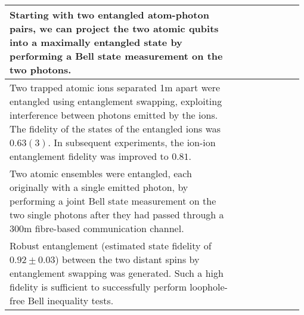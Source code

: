 \begin{table*}[!htbp]
\begin{tabular}{|p{0.755\linewidth}|p{0.22\linewidth}|}
		\hline
		Starting with two entangled atom-photon pairs, we can project the two atomic qubits into a maximally entangled state by performing a Bell state measurement on the two photons.&\cite{bib:blinov2004observation, bib:PRL_96_030404}\\
		\hline
		Two trapped atomic ions separated 1m apart were entangled using entanglement swapping, exploiting interference between photons emitted by the ions. The fidelity of the states of the entangled ions was $0.63(3)$. In subsequent experiments, the ion-ion entanglement fidelity was improved to $0.81$.&\cite{bib:Nature_449_68,bib:PRL_100_150404}\\
		\hline
		Two atomic ensembles were entangled, each originally with a single emitted photon, by performing a joint Bell state measurement on the two single photons after they had passed through a 300m fibre-based communication channel.&\cite{bib:Nature_454_1098}\\\hline
		Robust entanglement (estimated state fidelity of $0.92\pm0.03$) between the two distant spins by entanglement swapping was generated. Such a high fidelity is sufficient to successfully perform loophole-free Bell inequality tests.&\cite{bib:hensen2015loophole}\\\hline

\end{tabular}
\end{table*}

